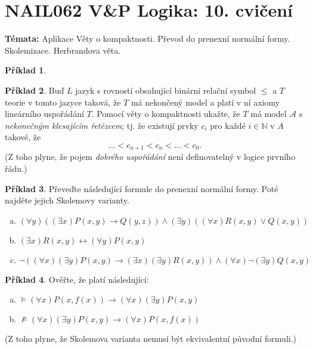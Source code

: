 \documentclass[a4paper]{article}
\theoremstyle{definition}
\newtheorem{problem}{Příklad}
\begin{document}
\section*{NAIL062 V\&P Logika: 10. cvičení}


\textbf{Témata:}
Aplikace Věty o kompaktnosti. Převod do prenexní normální formy. Skolemizace. Herbrandova věta.


\medskip\begin{problem}
 
\end{problem}


\medskip\begin{problem} Buď $L$ jazyk s rovností obsahující binární relační symbol $\le$ a $T$ teorie v tomto jazyce taková, že $T$ má nekončený model a platí v ní axiomy lineárního uspořádání $T$. Pomocí věty o kompaktnosti ukažte, že $T$ má model $\mathcal{A}$ s \emph{nekonečným klesajícím řetězcem}; tj. že existují prvky $c_i$ pro každé $i\in \mathbb{N}$ v $A$ takové, že 
    $$\dots < c_{n+1} < c_n< \dots <c_0.$$
    (Z toho plyne, že pojem \emph{dobrého uspořádání} není definovatelný v logice prvního řádu.)
\end{problem}


\medskip\begin{problem} Převeďte následující formule do prenexní normální formy. Poté najděte jejich Skolemovy varianty.
\begin{enumerate}[(a)]
    \item $(\forall y)((\exists x)P(x,y)\to Q(y,z))\wedge (\exists y)((\forall x)R(x,y)\vee Q(x,y))$
    \item $(\exists x)R(x,y)\leftrightarrow (\forall y)P(x,y)$
    \item $\neg((\forall x)(\exists y)P(x,y)\to (\exists x)(\exists y)R(x,y))\wedge(\forall x)\neg(\exists y)Q(x,y)$
\end{enumerate}
\end{problem}

    
\medskip\begin{problem} Ověřte, že platí následující:
\begin{enumerate}[(a)]
    \item $\models (\forall x)P(x,f(x)) \to (\forall x)(\exists y)P(x,y)$
    \item $\not\models (\forall x)(\exists y)P(x,y)\to (\forall x)P(x,f(x))$
\end{enumerate}
(Z toho plyne, že Skolemova varianta nemusí být ekvivalentní původní formuli.)
\end{problem}
\end{document}
